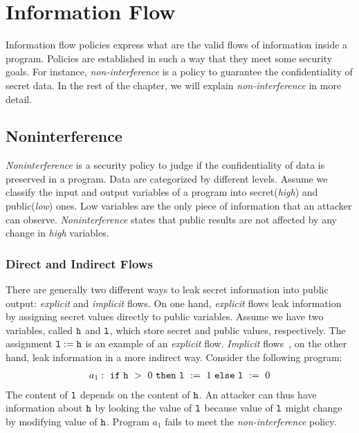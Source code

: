 \documentclass{report}
\begin{document}

\chapter{Information Flow}

Information flow policies express what are the valid flows of information
inside a program. Policies are established in such a way that they meet
some security goals. For instance, {\it non-interference} is a policy to
guarantee the confidentiality of secret data. In the rest of the chapter, we will explain
{\it non-interference} in more detail.

\section{Noninterference}
\label{chap2:noninterference}
{\it Noninterference} is a security policy to judge if the confidentiality of data
is preserved in a program. Data are categorized by different levels.
Assume we classify the input and output variables of a program 
into secret({\it high}) and public({\it low}) ones. 
Low variables are the only piece of information that an attacker can observe.
{\it Noninterference} states that public results are not affected by any
change in {\it high} variables. 

\subsection{Direct and Indirect Flows}
There are generally two different ways to leak secret information into
public output: {\it explicit} and {\it implicit} flows. 
On one hand,
{\it explicit} flows leak information by assigning secret values
directly to public variables.
Assume we have two variables, called $\mathtt{h}$ and $\mathtt{l}$,
which store secret and public values, respectively. 
The assignment $\mathtt{l} := \mathtt{h}$ is an example of an {\it explicit} flow.
{\it Implicit} flows~\cite{Denning:Denning:Certification}, on the other hand,
leak information in a more indirect way.
Consider the following program:
\begin{align*}
a_1:~\mathtt{if}~\mathtt{h}~>~0~\mathtt{then}~\mathtt{l}~:=~1~\mathtt{else}~\mathtt{l}~:=~0
\end{align*}
The content of $\mathtt{l}$ depends on the content of $\mathtt{h}$.
An attacker can thus have information about $\mathtt{h}$ by looking
the value of $\mathtt{l}$ because value of $\mathtt{l}$ might change by
modifying value of $\mathtt{h}$. 
Program $a_1$ fails to meet the {\it non-interference} policy.
\end{document}

